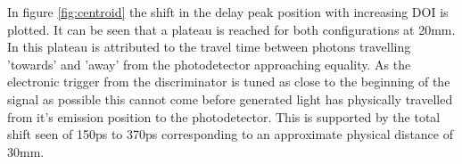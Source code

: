 In figure \ref{fig:centroid} the shift in the delay peak position with increasing DOI is plotted. It can be seen that a plateau is reached for both configurations at 20mm. In \cite{Moses_Derenzo_1999} this plateau is attributed to the travel time between photons travelling 'towards' and 'away' from the photodetector approaching equality. As the electronic trigger from the discriminator is tuned as close to the beginning of the signal as possible this cannot come before generated light has physically travelled from it's emission position to the photodetector. This is supported by the total shift seen of 150ps to 370ps corresponding to an approximate physical distance of 30mm.